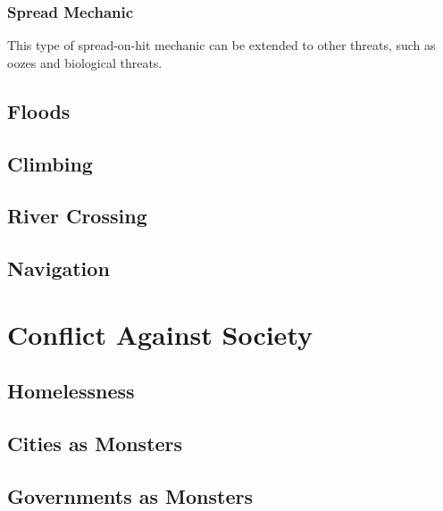 \documentclass[twocolumn]{dndbook}
\begin{document}
\subsection{Spread Mechanic}

This type of spread-on-hit mechanic can be extended to other threats, such as oozes and biological threats.

\section{Floods}

\section{Climbing}




\section{River Crossing}


\section{Navigation}


\chapter{Conflict Against Society}
\section{Homelessness}
\section{Cities as Monsters}
\section{Governments as Monsters}
\end{document}
